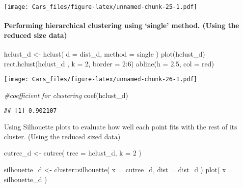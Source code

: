 \documentclass[
]{article}
\newenvironment{Shaded}{\begin{snugshade}}{\end{snugshade}}
\newcommand{\AttributeTok}[1]{\textcolor[rgb]{0.77,0.63,0.00}{#1}}
\newcommand{\CommentTok}[1]{\textcolor[rgb]{0.56,0.35,0.01}{\textit{#1}}}
\newcommand{\DecValTok}[1]{\textcolor[rgb]{0.00,0.00,0.81}{#1}}
\newcommand{\FloatTok}[1]{\textcolor[rgb]{0.00,0.00,0.81}{#1}}
\newcommand{\FunctionTok}[1]{\textcolor[rgb]{0.00,0.00,0.00}{#1}}
\newcommand{\NormalTok}[1]{#1}
\newcommand{\OtherTok}[1]{\textcolor[rgb]{0.56,0.35,0.01}{#1}}
\newcommand{\SpecialCharTok}[1]{\textcolor[rgb]{0.00,0.00,0.00}{#1}}
\newcommand{\StringTok}[1]{\textcolor[rgb]{0.31,0.60,0.02}{#1}}
\begin{document}
\texttt{[image: Cars\_files/figure-latex/unnamed-chunk-25-1.pdf]}

\hypertarget{performing-hierarchical-clustering-using-single-method.-using-the-reduced-size-data}{%
\paragraph{Performing hierarchical clustering using `single' method.
(Using the reduced size
data)}\label{performing-hierarchical-clustering-using-single-method.-using-the-reduced-size-data}}

\begin{Shaded}
\begin{Highlighting}[]
\NormalTok{hclust\_d }\OtherTok{\textless{}{-}} \FunctionTok{hclust}\NormalTok{(}
  \AttributeTok{d =}\NormalTok{ dist\_d,}
  \AttributeTok{method =} \StringTok{\textquotesingle{}single\textquotesingle{}}
\NormalTok{)}
\FunctionTok{plot}\NormalTok{(hclust\_d)}
\FunctionTok{rect.hclust}\NormalTok{(hclust\_d , }\AttributeTok{k =} \DecValTok{2}\NormalTok{, }\AttributeTok{border =} \DecValTok{2}\SpecialCharTok{:}\DecValTok{6}\NormalTok{)}
\FunctionTok{abline}\NormalTok{(}\AttributeTok{h =} \FloatTok{2.5}\NormalTok{, }\AttributeTok{col =} \StringTok{\textquotesingle{}red\textquotesingle{}}\NormalTok{)}
\end{Highlighting}
\end{Shaded}

\texttt{[image: Cars\_files/figure-latex/unnamed-chunk-26-1.pdf]}

\begin{Shaded}
\begin{Highlighting}[]
\CommentTok{\#coefficient for clustering}
\FunctionTok{coef}\NormalTok{(hclust\_d)}
\end{Highlighting}
\end{Shaded}

\begin{verbatim}
## [1] 0.902107
\end{verbatim}

Using Silhouette plots to evaluate how well each point fits with the
rest of its cluster. (Using the reduced sized data)

\begin{Shaded}
\begin{Highlighting}[]
\NormalTok{cutree\_d }\OtherTok{\textless{}{-}} \FunctionTok{cutree}\NormalTok{(}
  \AttributeTok{tree =}\NormalTok{ hclust\_d,}
  \AttributeTok{k =} \DecValTok{2}
\NormalTok{)}

\NormalTok{silhouette\_d }\OtherTok{\textless{}{-}}\NormalTok{ cluster}\SpecialCharTok{::}\FunctionTok{silhouette}\NormalTok{(}
  \AttributeTok{x =}\NormalTok{ cutree\_d,}
  \AttributeTok{dist =}\NormalTok{ dist\_d}
\NormalTok{)}
\FunctionTok{plot}\NormalTok{(}
  \AttributeTok{x =}\NormalTok{ silhouette\_d}
\NormalTok{)}
\end{Highlighting}
\end{Shaded}
\end{document}
